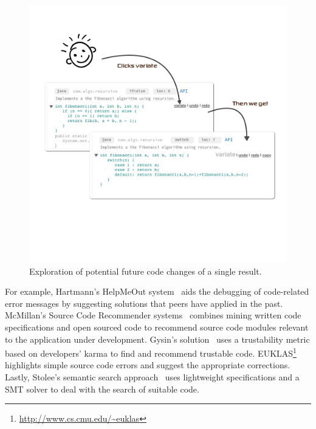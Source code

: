 \begin{figure}[!ht]
    \centering
    \includegraphics[width=\textwidth]{images/basealternative}
    \caption{Exploration of potential future code changes of a single result.}
    \label{fig:basealternative}
\end{figure}

For example, Hartmann's HelpMeOut system~\cite{Hartmann:2010hx} aids the debugging of code-related error messages by suggesting solutions that peers have applied in the past. McMillan's Source Code Recommender systems~\cite{McMillan:2012dj} combines mining written code specifications and open sourced code to recommend source code modules relevant to the application under development. Gysin's solution~\cite{Gysin:2010kt} uses a trustability metric based on developers' karma to find and recommend trustable code. EUKLAS\footnote{\url{http://www.cs.cmu.edu/~euklas}} highlights simple source code errors and suggest the appropriate corrections. Lastly, Stolee's semantic search approach~\cite{Stolee:2012wp} uses lightweight specifications and a SMT solver to deal with the search of suitable code.  


